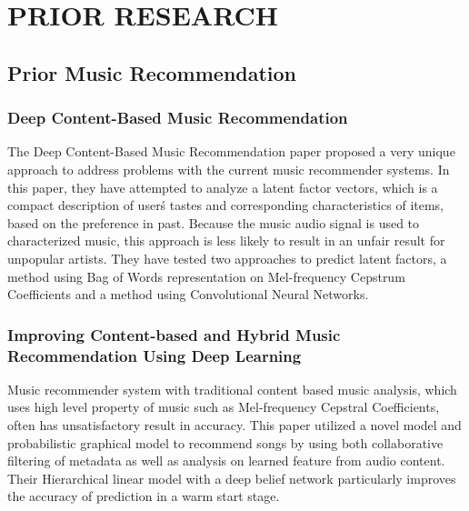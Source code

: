 \section{PRIOR RESEARCH}
    \subsection{Prior Music Recommendation}
        \subsubsection{Deep Content-Based Music Recommendation \cite{NIPS2013_5004}}
        
        The Deep Content-Based Music Recommendation paper proposed a very unique approach to address problems with the current music recommender systems. In this paper, they have attempted to analyze a latent factor vectors, which is a compact description of user\'s tastes and corresponding characteristics of items, based on the preference in past. Because the music audio signal is used to characterized music, this approach is less likely to result in an unfair result for unpopular artists. They have tested two approaches to predict latent factors, a method using Bag of Words representation on Mel-frequency Cepstrum Coefficients and a method using Convolutional Neural Networks.
        
        \subsubsection{Improving Content-based and Hybrid Music Recommendation Using Deep Learning \cite{Wang:2014:ICH:2647868.2654940}}
        
        Music recommender system with traditional content based music analysis, which uses high level property of music such as Mel-frequency Cepstral Coefficients, often has unsatisfactory result in accuracy. This paper utilized a novel model and probabilistic graphical model to recommend songs by using both collaborative filtering of metadata as well as analysis on learned feature from audio content. Their Hierarchical linear model with a deep belief network particularly improves the accuracy of prediction in a warm start stage. 
        
